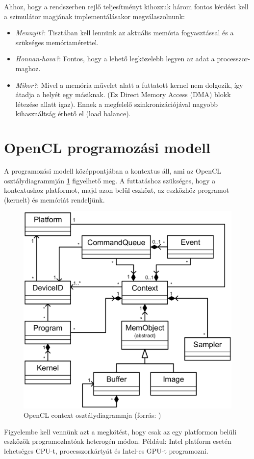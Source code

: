 	Ahhoz, hogy a rendszerben rejlő teljesítményt kihozzuk három fontos kérdést
	kell a szimulátor magjának implementálásakor megválaszolnunk:
	\begin{itemize}
		\item \emph{Mennyit?}: Tisztában kell lennünk az aktuális
		memória fogyasztással és a szükséges memóriamérettel.
		\item \emph{Honnan-hova?}: Fontos, hogy a lehető legközelebb legyen az adat
		a processzor-maghoz.
		\item \emph{Mikor?}: Mivel a memória művelet alatt a futtatott kernel nem
		dolgozik, így átadja a helyét egy másiknak. (Ez Direct Memory Access (DMA)
		blokk létezése allatt igaz). Ennek a megfelelő szinkronizációjával nagyobb
		kihasználtság érhető el (load balance).
	\end{itemize}
	
	
\section{OpenCL programozási modell}
	
	A programozási modell középpontjában a kontextus áll, ami az OpenCL
	osztálydiagrammján \ref{fig:class} figyelhető meg.
	A futtatáshoz szükséges, hogy a kontextushoz platformot, majd azon belül
	eszközt, az eszközhöz programot (kernelt) és memóriát rendeljünk.
	\begin{figure}[!h]
		\centering
		\includegraphics[width=0.6\columnwidth]{figures/eps/context.eps}
		\caption{OpenCL context osztálydiagrammja (forrás: \cite{opencl})} 
		\label{fig:class} 
	\end{figure}
	Figyelembe kell vennünk azt a megkötést, hogy csak az egy platformon belüli
	eszközök programozhatóak heterogén módon. Például: Intel platform esetén
	lehetséges CPU-t, processzorkártyát és Intel-es GPU-t programozni.
	
